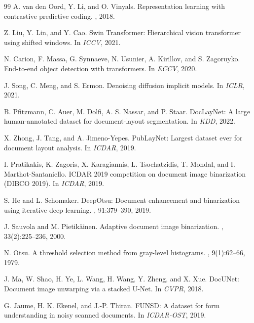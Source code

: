\documentclass[conference]{IEEEtran}
\begin{document}
{\begin{thebibliography}{99}
A. van den Oord, Y. Li, and O. Vinyals.
\newblock Representation learning with contrastive predictive coding.
, 2018.

Z. Liu, Y. Lin, and Y. Cao.
\newblock Swin Transformer: Hierarchical vision transformer using shifted windows.
\newblock In {\em ICCV}, 2021.

N. Carion, F. Massa, G. Synnaeve, N. Usunier, A. Kirillov, and S. Zagoruyko.
\newblock End-to-end object detection with transformers.
\newblock In {\em ECCV}, 2020.

J. Song, C. Meng, and S. Ermon.
\newblock Denoising diffusion implicit models.
\newblock In {\em ICLR}, 2021.

B. Pfitzmann, C. Auer, M. Dolfi, A. S. Nassar, and P. Staar.
\newblock DocLayNet: A large human-annotated dataset for document-layout segmentation.
\newblock In {\em KDD}, 2022.

X. Zhong, J. Tang, and A. Jimeno-Yepes.
\newblock PubLayNet: Largest dataset ever for document layout analysis.
\newblock In {\em ICDAR}, 2019.

I. Pratikakis, K. Zagoris, X. Karagiannis, L. Tsochatzidis, T. Mondal, and I. Marthot-Santaniello.
\newblock ICDAR 2019 competition on document image binarization (DIBCO 2019).
\newblock In {\em ICDAR}, 2019.

S. He and L. Schomaker.
\newblock DeepOtsu: Document enhancement and binarization using iterative deep learning.
, 91:379--390, 2019.

J. Sauvola and M. Pietik{\"a}inen.
\newblock Adaptive document image binarization.
, 33(2):225--236, 2000.

N. Otsu.
\newblock A threshold selection method from gray-level histograms.
, 9(1):62--66, 1979.

J. Ma, W. Shao, H. Ye, L. Wang, H. Wang, Y. Zheng, and X. Xue.
\newblock DocUNet: Document image unwarping via a stacked U-Net.
\newblock In {\em CVPR}, 2018.

G. Jaume, H. K. Ekenel, and J.-P. Thiran.
\newblock FUNSD: A dataset for form understanding in noisy scanned documents.
\newblock In {\em ICDAR-OST}, 2019.

\end{thebibliography}
}
\end{document}
